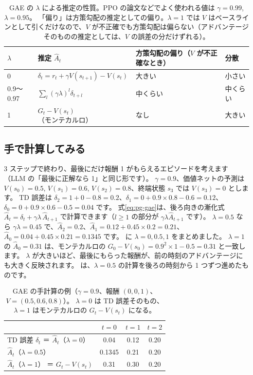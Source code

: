 \begin{table}[tbp]
\centering
\caption{GAE の $\lambda$ による推定の性質。PPO の論文などでよく使われる値は $\gamma=0.99$, $\lambda=0.95$\cite{schulman2017proximal}。
「偏り」は方策勾配の推定としての偏り。$\lambda=1$ では $V$ はベースラインとして引くだけなので、$V$ が不正確でも方策勾配は偏らない（アドバンテージそのものの推定としては、$V$ の誤差の分だけずれる）。}
\label{tab:pg-lambda}
\small
\begin{tabular}{llll}
\toprule
$\lambda$ & 推定 $\hat{A}_t$ & 方策勾配の偏り（$V$ が不正確なとき） & 分散 \\
\midrule
0 & $\delta_t=r_t+\gamma V(s_{t+1})-V(s_t)$ & 大きい & 小さい \\
0.9〜0.97 & $\sum_l(\gamma\lambda)^l\delta_{t+l}$ & 中くらい & 中くらい \\
1 & $G_t-V(s_t)$（モンテカルロ） & なし & 大きい \\
\bottomrule
\end{tabular}
\end{table}

\subsection*{手で計算してみる}

3 ステップで終わり、最後にだけ報酬 1 がもらえるエピソードを考えます（LLM の「最後に正解なら 1」と同じ形です）。
$\gamma=0.9$、価値ネットの予測は $V(s_0)=0.5$, $V(s_1)=0.6$, $V(s_2)=0.8$、終端状態 $s_3$ では $V(s_3)=0$ とします。
TD 誤差は
$\delta_2=1+0-0.8=0.2$、$\delta_1=0+0.9\times0.8-0.6=0.12$、$\delta_0=0+0.9\times0.6-0.5=0.04$ です。
式\eqref{eq:pg-gae}は、後ろ向きの漸化式 $\hat{A}_t=\delta_t+\gamma\lambda\,\hat{A}_{t+1}$ で計算できます（$l\ge1$ の部分が $\gamma\lambda\hat{A}_{t+1}$ です）。
$\lambda=0.5$ なら $\gamma\lambda=0.45$ で、$\hat{A}_2=0.2$、$\hat{A}_1=0.12+0.45\times0.2=0.21$、$\hat{A}_0=0.04+0.45\times0.21=0.1345$ です。
に $\lambda=0,0.5,1$ をまとめました。
$\lambda=1$ の $\hat{A}_0=0.31$ は、モンテカルロの $G_0-V(s_0)=0.9^2\times1-0.5=0.31$ と一致します。
$\lambda$ が大きいほど、最後にもらった報酬が、前の時刻のアドバンテージにも大きく反映されます。
は、$\lambda=0.5$ の計算を後ろの時刻から 1 つずつ進めたものです。

\begin{table}[tbp]
\centering
\caption{GAE の手計算の例（$\gamma=0.9$、報酬 $(0,0,1)$、$V=(0.5,0.6,0.8)$）。
$\lambda=0$ は TD 誤差そのもの、$\lambda=1$ はモンテカルロの $G_t-V(s_t)$ になる。}
\label{tab:pg-gae-example}
\small
\begin{tabular}{lccc}
\toprule
 & $t=0$ & $t=1$ & $t=2$ \\
\midrule
TD 誤差 $\delta_t$ ＝ $\hat{A}_t$（$\lambda=0$） & 0.04 & 0.12 & 0.20 \\
$\hat{A}_t$（$\lambda=0.5$） & 0.1345 & 0.21 & 0.20 \\
$\hat{A}_t$（$\lambda=1$） ＝ $G_t-V(s_t)$ & 0.31 & 0.30 & 0.20 \\
\bottomrule
\end{tabular}
\end{table}


